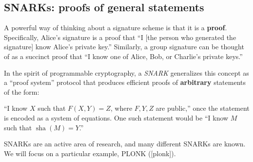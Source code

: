 \subsection{SNARKs: proofs of general statements}

A powerful way of thinking about a signature scheme is that it is a
\textbf{proof}. Specifically, Alice's signature is a proof that ``I
{[}the person who generated the signature{]} know Alice's private key.''
Similarly, a group signature can be thought of as a succinct proof that
``I know one of Alice, Bob, or Charlie's private keys.''

In the spirit of programmable cryptography, a \emph{SNARK} generalizes
this concept as a ``proof system'' protocol that produces efficient
proofs of \textbf{arbitrary} statements of the form:

``I know \(X\) such that \(F(X,Y) = Z\), where \(F,Y,Z\) are public,''
once the statement is encoded as a system of equations. One such
statement would be ``I know \(M\) such that
\(\operatorname{sha}(M) = Y\).''

SNARKs are an active area of research, and many different SNARKs are
known. We will focus on a particular example, PLONK ({[}plonk{]}).
